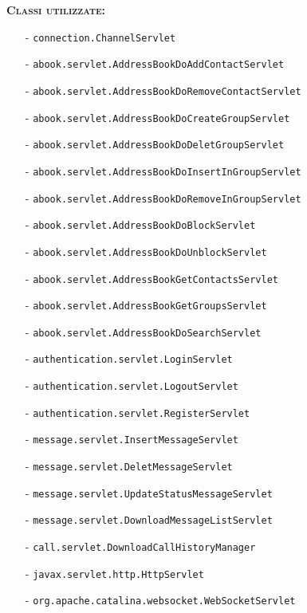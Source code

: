 \begin{description}
	\item{\scshape\bfseries Classi utilizzate:}\\
	\begin{itemize}[noitemsep,nolistsep]
	  \item[-] \texttt{connection.ChannelServlet}
	  \item[-] \texttt{abook.servlet.AddressBookDoAddContactServlet}
	  \item[-] \texttt{abook.servlet.AddressBookDoRemoveContactServlet}
	  \item[-] \texttt{abook.servlet.AddressBookDoCreateGroupServlet}
	  \item[-] \texttt{abook.servlet.AddressBookDoDeletGroupServlet}
	  \item[-] \texttt{abook.servlet.AddressBookDoInsertInGroupServlet}
	  \item[-] \texttt{abook.servlet.AddressBookDoRemoveInGroupServlet}
	  \item[-] \texttt{abook.servlet.AddressBookDoBlockServlet}
	  \item[-] \texttt{abook.servlet.AddressBookDoUnblockServlet}
	  \item[-] \texttt{abook.servlet.AddressBookGetContactsServlet}
	  \item[-] \texttt{abook.servlet.AddressBookGetGroupsServlet}
	  \item[-] \texttt{abook.servlet.AddressBookDoSearchServlet}
	  \item[-] \texttt{authentication.servlet.LoginServlet}
	  \item[-] \texttt{authentication.servlet.LogoutServlet}
	  \item[-] \texttt{authentication.servlet.RegisterServlet}
	  \item[-] \texttt{message.servlet.InsertMessageServlet}
	  \item[-] \texttt{message.servlet.DeletMessageServlet}
	  \item[-] \texttt{message.servlet.UpdateStatusMessageServlet}
	  \item[-] \texttt{message.servlet.DownloadMessageListServlet}
	  \item[-] \texttt{call.servlet.DownloadCallHistoryManager}
	  \item[-] \texttt{javax.servlet.http.HttpServlet}
	  \item[-] \texttt{org.apache.catalina.websocket.WebSocketServlet}
	\end{itemize}
\end{description}

